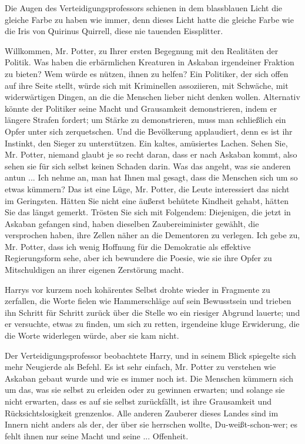 Die Augen des Verteidigungsprofessors schienen in dem blassblauen Licht die
gleiche Farbe zu haben wie immer, denn dieses Licht hatte die gleiche Farbe wie
die Iris von Quirinus Quirrell, diese nie tauenden Eissplitter.

\glqq{}Willkommen, Mr. Potter, zu Ihrer ersten Begegnung mit den Realitäten der
Politik. Was haben die erbärmlichen Kreaturen in Askaban irgendeiner Fraktion zu
bieten? Wem würde es nützen, ihnen zu helfen? Ein Politiker, der sich offen auf
ihre Seite stellt, würde sich mit Kriminellen assoziieren, mit Schwäche, mit
widerwärtigen Dingen, an die die Menschen lieber nicht denken wollen. Alternativ
könnte der Politiker seine Macht und Grausamkeit demonstrieren, indem er längere
Strafen fordert; um Stärke zu demonstrieren, muss man schließlich ein Opfer
unter sich zerquetschen. Und die Bevölkerung applaudiert, denn es ist ihr
Instinkt, den Sieger zu unterstützen.\grqq{} Ein kaltes, amüsiertes Lachen.
\glqq{}Sehen Sie, Mr. Potter, niemand glaubt je so recht daran, dass er nach
Askaban kommt, also sehen sie für sich selbst keinen Schaden darin. Was das
angeht, was sie anderen antun ... Ich nehme an, man hat Ihnen mal gesagt, dass
die Menschen sich um so etwas kümmern? Das ist eine Lüge, Mr. Potter, die Leute
interessiert das nicht im Geringsten. Hätten Sie nicht eine äußerst behütete
Kindheit gehabt, hätten Sie das längst gemerkt. Trösten Sie sich mit Folgendem:
Diejenigen, die jetzt in Askaban gefangen sind, haben dieselben Zaubereiminister
gewählt, die versprochen haben, ihre Zellen näher an die Dementoren zu verlegen.
Ich gebe zu, Mr. Potter, dass ich wenig Hoffnung für die Demokratie als
effektive Regierungsform sehe, aber ich bewundere die Poesie, wie sie ihre Opfer
zu Mitschuldigen an ihrer eigenen Zerstörung macht.\grqq{}

Harrys vor kurzem noch kohärentes Selbst drohte wieder in Fragmente zu
zerfallen, die Worte fielen wie Hammerschläge auf sein Bewusstsein und trieben
ihn Schritt für Schritt zurück über die Stelle wo ein riesiger Abgrund lauerte;
und er versuchte, etwas zu finden, um sich zu retten, irgendeine kluge
Erwiderung, die die Worte widerlegen würde, aber sie kam nicht.

Der Verteidigungsprofessor beobachtete Harry, und in seinem Blick spiegelte sich
mehr Neugierde als Befehl. \glqq{}Es ist sehr einfach, Mr. Potter zu verstehen
wie Askaban gebaut wurde und wie es immer noch ist. Die Menschen kümmern sich um
das, was sie selbst zu erleiden oder zu gewinnen erwarten; und solange sie nicht
erwarten, dass es auf sie selbst zurückfällt, ist ihre Grausamkeit und
Rücksichtslosigkeit grenzenlos. Alle anderen Zauberer dieses Landes sind im
Innern nicht anders als der, der über sie herrschen wollte, Du-weißt-schon-wer;
es fehlt ihnen nur seine Macht und seine ... Offenheit.\grqq{}

